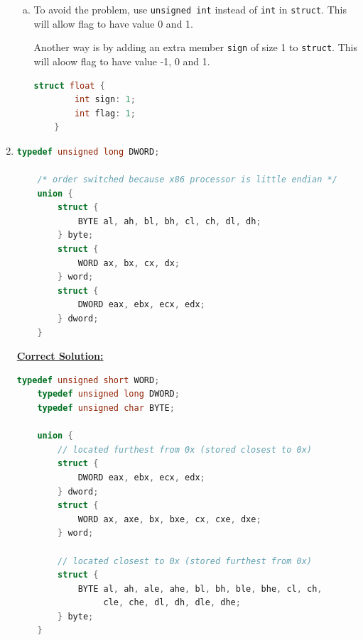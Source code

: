 \documentclass[12pt]{article}
\begin{document}
\begin{enumerate}[1.]
\begin{mdframed}
\begin{enumerate}[a)]
        \item

        To avoid the problem, use \texttt{unsigned int} instead of \texttt{int} in \texttt{struct}.
        \color{red}This will allow flag to have value 0 and 1\color{black}.

        \bigskip

        \color{red}Another way is by adding an extra member \texttt{sign} of size 1 to \texttt{struct}.
        This will aloow flag to have value -1, 0 and 1.

        \bigskip

\begin{lstlisting}[language=c]
    struct float {
        int sign: 1;
        int flag: 1;
    }
\end{lstlisting}
    \end{enumerate}
    \end{mdframed}

    \item

\begin{lstlisting}[language=c]
    typedef unsigned long DWORD;

    /* order switched because x86 processor is little endian */
    union {
        struct {
            BYTE al, ah, bl, bh, cl, ch, dl, dh;
        } byte;
        struct {
            WORD ax, bx, cx, dx;
        } word;
        struct {
            DWORD eax, ebx, ecx, edx;
        } dword;
    }
\end{lstlisting}

    \bigskip

    \begin{mdframed}

    \underline{\textbf{Correct Solution:}}

\begin{lstlisting}[language=c]
    typedef unsigned short WORD;
    typedef unsigned long DWORD;
    typedef unsigned char BYTE;

    union {
        // located furthest from 0x (stored closest to 0x)
        struct {
            DWORD eax, ebx, ecx, edx;
        } dword;
        struct {
            WORD ax, axe, bx, bxe, cx, cxe, dxe;
        } word;

        // located closest to 0x (stored furthest from 0x)
        struct {
            BYTE al, ah, ale, ahe, bl, bh, ble, bhe, cl, ch,
                 cle, che, dl, dh, dle, dhe;
        } byte;
    }
\end{lstlisting}


\end{mdframed}
\end{enumerate}
\end{document}
